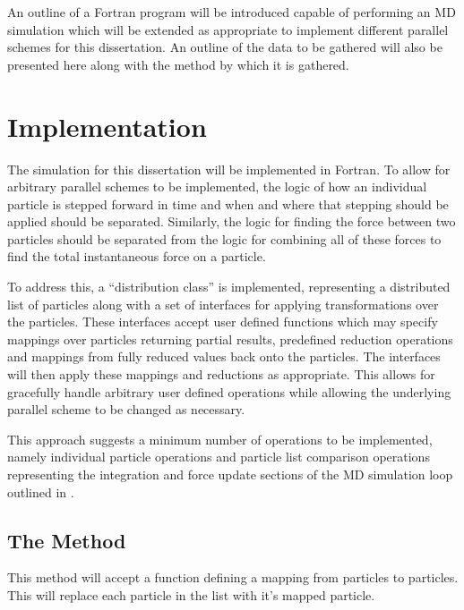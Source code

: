 An outline of a Fortran program will be introduced capable
of performing an MD simulation which will be extended as appropriate
to implement different parallel schemes for this dissertation.
%
An outline of the data to be gathered will also be presented here
along with the method by which it is gathered.

\section{Implementation}
\label{sec:methodology:subsec:implementation}

The simulation for this dissertation will be implemented in Fortran.
%
To allow for arbitrary parallel schemes to be implemented,
the logic of how an individual particle is stepped forward
in time and when and where that stepping should be applied
should be separated.
%
Similarly, the logic for finding the force between two particles
should be separated from the logic for combining all of these
\twobody{} forces to find the total instantaneous force on a particle.

To address this, a ``distribution class'' is implemented,
representing a distributed list of particles
along with a set of interfaces for
applying transformations over the particles.
%
These interfaces accept user defined functions which may specify
mappings over particles returning partial results,
predefined reduction operations and
mappings from fully reduced values back onto the particles.
%
The interfaces will then apply these mappings and reductions
as appropriate.
%
This allows for gracefully handle arbitrary user defined operations while
allowing the underlying parallel scheme to be changed as necessary.

%
This approach suggests a minimum number of operations to be implemented,
namely individual particle operations and particle list comparison
operations representing the integration and force update sections
of the MD simulation loop outlined in .


\subsection{The \individualoperation{} Method}
\label{sec:the_individual_operation_method}

This method will accept a function defining a mapping from
particles to particles.
This will replace each particle in the list with it's mapped
particle.


